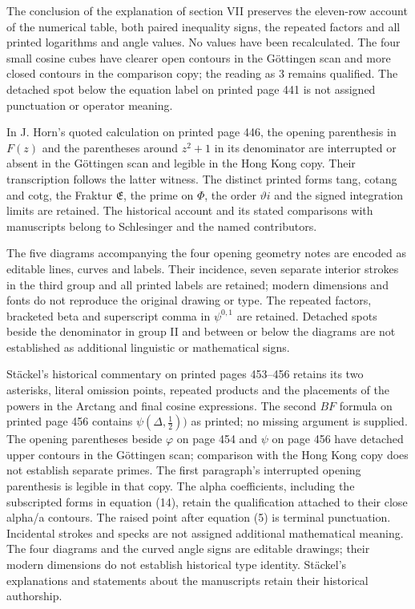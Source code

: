 The conclusion of the explanation of section VII preserves the eleven-row account of the numerical table, both paired inequality signs, the repeated factors and all printed logarithms and angle values. No values have been recalculated. The four small cosine cubes have clearer open contours in the Göttingen scan and more closed contours in the comparison copy; the reading as 3 remains qualified. The detached spot below the equation label on printed page 441 is not assigned punctuation or operator meaning.

In J. Horn’s quoted calculation on printed page 446, the opening parenthesis in $F(z)$ and the parentheses around $z^2+1$ in its denominator are interrupted or absent in the Göttingen scan and legible in the Hong Kong copy. Their transcription follows the latter witness. The distinct printed forms tang, cotang and cotg, the Fraktur $\mathfrak E$, the prime on $\Phi$, the order $\vartheta i$ and the signed integration limits are retained. The historical account and its stated comparisons with manuscripts belong to Schlesinger and the named contributors.

The five diagrams accompanying the four opening geometry notes are encoded as editable lines, curves and labels. Their incidence, seven separate interior strokes in the third group and all printed labels are retained; modern dimensions and fonts do not reproduce the original drawing or type. The repeated factors, bracketed beta and superscript comma in $\psi^{0,1}$ are retained. Detached spots beside the denominator in group II and between or below the diagrams are not established as additional linguistic or mathematical signs.

Stäckel’s historical commentary on printed pages 453–456 retains its two asterisks, literal omission points, repeated products and the placements of the powers in the Arctang and final cosine expressions. The second $BF$ formula on printed page 456 contains $\psi(\Delta,\tfrac12))$ as printed; no missing argument is supplied. The opening parentheses beside $\varphi$ on page 454 and $\psi$ on page 456 have detached upper contours in the Göttingen scan; comparison with the Hong Kong copy does not establish separate primes. The first paragraph’s interrupted opening parenthesis is legible in that copy. The alpha coefficients, including the subscripted forms in equation (14), retain the qualification attached to their close alpha/a contours. The raised point after equation (5) is terminal punctuation. Incidental strokes and specks are not assigned additional mathematical meaning. The four diagrams and the curved angle signs are editable drawings; their modern dimensions do not establish historical type identity. Stäckel’s explanations and statements about the manuscripts retain their historical authorship.

